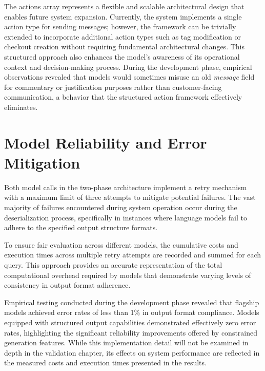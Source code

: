 The actions array represents a flexible and scalable architectural design that enables future system expansion.
Currently, the system implements a single action type for sending messages; however, the framework can be trivially extended to incorporate additional action types such as tag modification or checkout creation without requiring fundamental architectural changes.
This structured approach also enhances the model's awareness of its operational context and decision-making process.
During the development phase, empirical observations revealed that models would sometimes misuse an old \textit{message} field for commentary or justification purposes rather than customer-facing communication, a behavior that the structured action framework effectively eliminates.

\section{Model Reliability and Error Mitigation}

Both model calls in the two-phase architecture implement a retry mechanism with a maximum limit of three attempts to mitigate potential failures.
The vast majority of failures encountered during system operation occur during the deserialization process, specifically in instances where language models fail to adhere to the specified output structure formats.

To ensure fair evaluation across different models, the cumulative costs and execution times across multiple retry attempts are recorded and summed for each query.
This approach provides an accurate representation of the total computational overhead required by models that demonstrate varying levels of consistency in output format adherence.

Empirical testing conducted during the development phase revealed that flagship models achieved error rates of less than 1\% in output format compliance.
Models equipped with structured output capabilities demonstrated effectively zero error rates, highlighting the significant reliability improvements offered by constrained generation features.
While this implementation detail will not be examined in depth in the validation chapter, its effects on system performance are reflected in the measured costs and execution times presented in the results.
